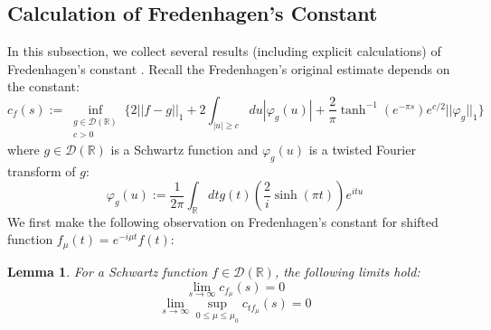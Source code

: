 \documentclass[a4paper,11pt]{article}
\newtheorem{lemma}[theorem]{Lemma}
\theoremstyle{definition}
\newcommand{\lb}{\left(}
\newcommand{\rb}{\right)}
\begin{document}
\subsection{Calculation of Fredenhagen's Constant}\label{subsection:gaussiansmear}
In this subsection, we collect several results (including explicit calculations) of Fredenhagen's constant \cite{fredenhagen}. Recall the Fredenhagen's original estimate depends on the constant:
\begin{equation}
    c_f(s):=\inf_{\substack{g\in\mathcal{D}(\mathbb{R})\\ c > 0}}\{2||f - g||_1 + 2\int_{|u|\geq c}du|\varphi_g(u)| + \frac{2}{\pi}\tanh^{-1}(e^{-\pi s})e^{c/2}||\varphi_g||_1\}
\end{equation}
where $g\in\mathcal{D}(\mathbb{R})$ is a Schwartz function and $\varphi_g(u)$ is  a twisted Fourier transform of $g$:
\begin{equation}
    \varphi_g(u):=\frac{1}{2\pi}\int_\mathbb{R} dt g(t)\lb\frac{2}{i}\sinh(\pi t)\rb e^{itu}
\end{equation}
We first make the following observation on Fredenhagen's constant for shifted function $f_\mu(t) = e^{-i\mu t}f(t)$:
\begin{lemma}\label{lemma:shiftedfredenhagenconstant}
    For a Schwartz function $f\in \mathcal{D}(\mathbb{R})$, the following limits hold:
    \begin{equation}
        \lim_{s\rightarrow\infty}c_{f_\mu}(s) = 0
    \end{equation}
    \begin{equation}
        \lim_{s\rightarrow\infty}\sup_{0\leq \mu\leq\mu_0}c_{tf_\mu}(s) = 0
    \end{equation}
\end{lemma}
\end{document}
